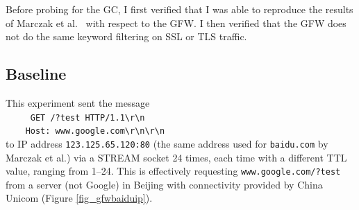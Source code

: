 Before probing for the GC, I first verified that I was able to reproduce the results of Marczak et al.~\cite{Marczak2015} with respect to the GFW.
I then verified that the GFW does not do the same keyword filtering on SSL or TLS traffic.
\subsection{Baseline}\label{gfwbaseline}
This experiment sent the message\\
\texttt{
	\-\ \ \ \ GET /?test HTTP/1.1\textbackslash{}r\textbackslash{}n\\
	\-\ \ \ \ Host: www.google.com\textbackslash{}r\textbackslash{}n\textbackslash{}r\textbackslash{}n\\
}
to IP address \texttt{123.125.65.120:80} (the same address used for \texttt{baidu.com} by Marczak et al.) via a STREAM socket 24 times, each time with a different TTL value, ranging from 1--24.
This is effectively requesting \texttt{www.google.com/?test} from a server (not Google) in Beijing with connectivity provided by China Unicom (Figure \ref{fig_gfwbaiduip}).
